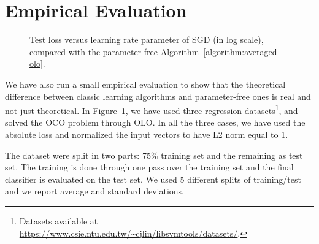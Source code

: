 \section{Empirical Evaluation}

\begin{figure}[t]
\centering
{}
\caption{\footnotesize{Test loss versus learning rate parameter of \ac{SGD} (in log scale), compared with the parameter-free Algorithm~\ref{algorithm:averaged-olo}.}}
\label{figure:experiments-olo}
\end{figure}

We have also run a small empirical evaluation to show that the theoretical
difference between classic learning algorithms and parameter-free ones is real
and not just theoretical. In Figure~\ref{figure:experiments-olo}, we have used
three regression datasets\footnote{Datasets available at
\url{https://www.csie.ntu.edu.tw/~cjlin/libsvmtools/datasets/}.}, and solved
the \ac{OCO} problem through \ac{OLO}. In all the three cases, we have used the
absolute loss and normalized the input vectors to have L2 norm equal to 1. 

The dataset were split in two parts: 75\% training set and the remaining as test set. The training is done through one pass over the training set and the final classifier is evaluated on the test set. We used 5 different splits of training/test and we report average and standard deviations. 

